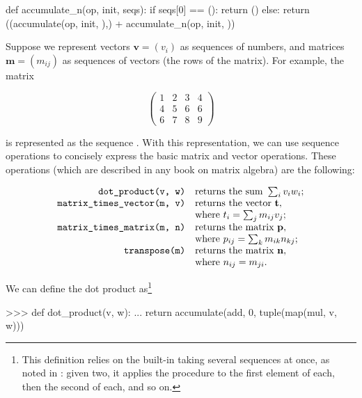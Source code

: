 \begin{exerciseGroup}
\begin{syntaxForm}
def accumulate_n(op, init, seqs):
    if seqs[0] == ():
        return ()
    else:
        return ((accumulate(op, init, ),)
                + accumulate_n(op, init, ))
\end{syntaxForm}

\label{Exercise 2.37}
Suppose we represent vectors \( \mathbf{v} = (v_i) \) as sequences of numbers,
and matrices \( \mathbf{m} = (m_{ij}) \) as sequences of vectors (the rows of
the matrix).  For example, the matrix

$$
\left(
\begin{array}{cccc}
  1 & 2 & 3 & 4 \\
  4 & 5 & 6 & 6 \\
  6 & 7 & 8 & 9
\end{array}
\right)
$$

\noindent
is represented as the sequence .  With
this representation, we can use sequence operations to concisely express the
basic matrix and vector operations.  These operations (which are described in
any book on matrix algebra) are the following:

$$
\begin{array}{rl}
	\text{\texttt{dot\_product(v, w)}} 		& \text{returns the sum } \sum_i v_i w_i; \\
	\text{\texttt{matrix\_times\_vector(m, v)}} 	& \text{returns the vector } \mathbf{t},  \\
& \text{where } t_i = \sum_j m_{ij} v_j;      \\
\text{\texttt{matrix\_times\_matrix(m, n)}} 	& \text{returns the matrix }
\mathbf{p},  \\ & \text{where } p_{ij} = \sum_k m_{ik} n_{kj};                 
\\ \text{\texttt{transpose(m)}} 		& \text{returns the matrix } \mathbf{n},  \\
& \text{where } n_{ij} = m_{ji}.
\end{array}
$$

We can define the dot product as\footnote{This definition relies on the
built-in  taking several sequences at once, as noted in
: given two, it applies the procedure to the first element
of each, then the second of each, and so on.}

\begin{codeBlock}
>>> def dot_product(v, w):
...     return accumulate(add, 0, tuple(map(mul, v, w)))
\end{codeBlock}


\end{exerciseGroup}
